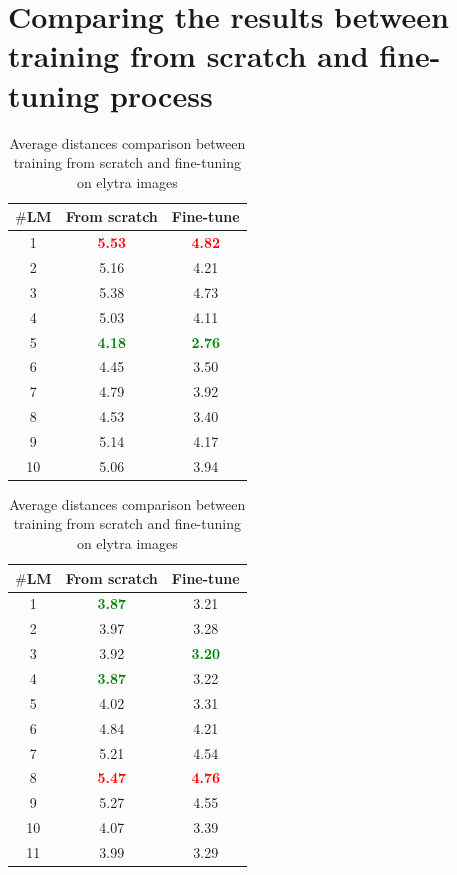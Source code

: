 \documentclass[review]{elsarticle}
\begin{document}
\pagebreak
\appendix
\section{Comparing the results between training from scratch and fine-tuning process}
\label{appdixA1}
\begin{table}[h]
	\begin{minipage}[t]{0.45\textwidth}
		\centering
		\begin{tabular}{|c|c|c|}
		\hline
		\textbf{$\#$LM} & \textbf{From scratch} & \textbf{Fine-tune} \\ \hline
		1 & \textcolor{red}{\textbf{5.53}} & \textcolor{red}{\textbf{4.82}}\\ \hline
		2 & 5.16 & 4.21 \\ \hline
		3 & 5.38  & 4.73 \\ \hline
		4 & 5.03  & 4.11 \\ \hline
		5 & \textcolor{green}{\textbf{4.18}}  & \textcolor{green}{\textbf{2.76}}\\ \hline
		6 & 4.45  & 3.50 \\ \hline
		7 & 4.79  & 3.92 \\ \hline
		8 & 4.53  & 3.40\\ \hline
		9 & 5.14  & 4.17 \\ \hline
		10 & 5.06  & 3.94\\ \hline
	\end{tabular}
	\caption{Average distances comparison between training from scratch and fine-tuning on head images}
	\label{cmptete}
	\end{minipage}
	\hfill
	\begin{minipage}[t]{0.45\textwidth}
		\centering
		\begin{tabular}{|c|c|c|}
			\hline
			\textbf{$\#$LM} & \textbf{From scratch} & \textbf{Fine-tune} \\ \hline
			1 & \textcolor{green}{\textbf{3.87}} & 3.21  \\ \hline
			2 & 3.97 & 3.28 \\ \hline
			3 & 3.92  & \textcolor{green}{\textbf{3.20}}\\ \hline
			4 & \textcolor{green}{\textbf{3.87}}  & 3.22 \\ \hline
			5 & 4.02  & 3.31 \\ \hline
			6 & 4.84  & 4.21\\ \hline
			7 & 5.21  & 4.54 \\ \hline
			8 & \textcolor{red}{\textbf{5.47}}  & \textcolor{red}{\textbf{4.76}}\\ \hline
			9 & 5.27  & 4.55 \\ \hline
			10 & 4.07  & 3.39 \\ \hline
			11 & 3.99  & 3.29 \\ \hline
		\end{tabular}
		\caption{Average distances comparison between training from scratch and fine-tuning on elytra images}
		\label{cmpelytre}
	\end{minipage}
\end{table}
\end{document}
